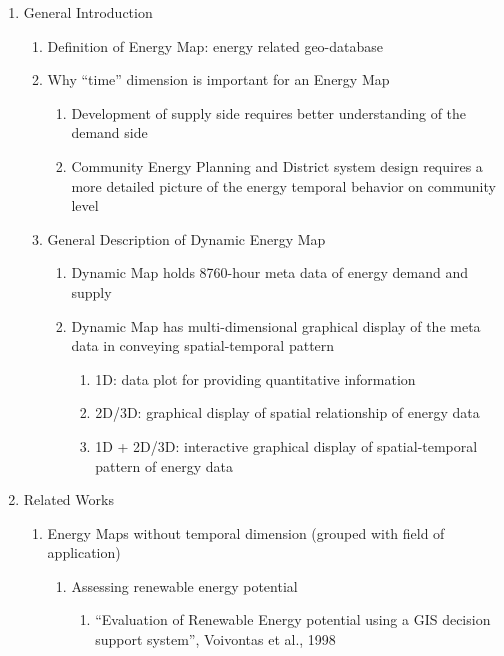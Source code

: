 \documentclass[12pt]{article}
\begin{document}
\begin{enumerate}
\item General Introduction
  \begin{enumerate}[label*=\arabic*.]
  \item Definition of Energy Map: energy related geo-database
  \item Why ``time'' dimension is important for an Energy Map
    \begin{enumerate}[label*=\arabic*.]
    \item Development of supply side requires better understanding of
      the demand side
    \item Community Energy Planning and District system design
      requires a more detailed picture of the energy temporal behavior
      on community level
    \end{enumerate}
  \item General Description of Dynamic Energy Map
    \begin{enumerate}[label*=\arabic*.]
    \item Dynamic Map holds 8760-hour meta data of energy demand
      and supply
    \item Dynamic Map has multi-dimensional graphical display of the
      meta data in conveying spatial-temporal pattern
      \begin{enumerate}[label*=\arabic*.]
      \item 1D: data plot for providing quantitative information
      \item 2D/3D: graphical display of spatial relationship of energy 
        data
      \item 1D + 2D/3D: interactive graphical display of
        spatial-temporal pattern of energy data
      \end{enumerate}
    \end{enumerate}
  \end{enumerate}
\item Related Works
  \begin{enumerate}[label*=\arabic*.]
  \item Energy Maps without temporal dimension (grouped with
    field of application)
    \begin{enumerate}[label*=\arabic*.]
    \item Assessing renewable energy potential
      \begin{enumerate}[label*=\arabic*.]
      \item ``Evaluation of Renewable Energy potential using a {GIS}
        decision support system'', Voivontas et al., 1998

\end{enumerate}
\end{enumerate}
\end{enumerate}
\end{enumerate}
\end{document}

